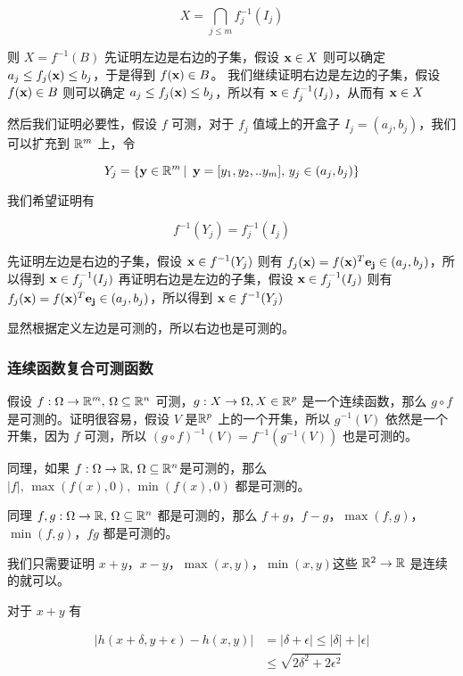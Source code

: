 \[
X = \bigcap_{j \le m}f_j^{-1}(I_j)
\]

则 $X = f^{-1}(B)$ 先证明左边是右边的子集，假设 $\mathbf{x} \in X$ 则可以确定 $a_j \le f_j(\mathbf{x}) \le b_j$，于是得到 $f(\mathbf{x}) \in B$。
我们继续证明右边是左边的子集，假设 $f(\mathbf{x}) \in B$ 则可以确定 $a_j \le f_j(\mathbf{x}) \le b_j$，所以有 $\mathbf{x} \in f_j^{-1}(I_j) $，从而有
$\mathbf{x} \in X$


然后我们证明必要性，假设 $f$ 可测，对于 $f_j$ 值域上的开盒子 $I_j = (a_j, b_j)$，我们可以扩充到 $\mathbb{R}^m$ 上，令

\[
Y_j = \{ \mathbf{y} \in \mathbb{R}^m \,\vert\,\ \mathbf{y} = [y_1, y_2, .. y_m] ,\, y_j \in (a_j, b_j)\}
\]

我们希望证明有

\[
f^{-1}(Y_j) = f_j^{-1}(I_j)
\]

先证明左边是右边的子集，假设 $\mathbf{x} \in f^{-1}(Y_j)$ 则有 $f_j(\mathbf{x}) = f(\mathbf{x})^T \mathbf{e_j} \in (a_j, b_j)$，所以得到 $\mathbf{x} \in f_j^{-1}(I_j)$
再证明右边是左边的子集，假设 $\mathbf{x} \in f_j^{-1}(I_j)$ 则有 $f_j(\mathbf{x}) = f(\mathbf{x})^T \mathbf{e_j} \in (a_j, b_j)$，所以得到 $\mathbf{x} \in f^{-1}(Y_j)$

显然根据定义左边是可测的，所以右边也是可测的。

\subsubsection{连续函数复合可测函数}

假设 $f: \Omega \to \mathbb{R}^m,\, \Omega \subseteq \mathbb{R}^n$ 可测，$g: X \to \Omega, X \in \mathbb{R}^p$ 是一个连续函数，那么 $g \circ f$ 是可测的。证明很容易，假设 $V$ 是$\mathbb{R}^p$ 上的一个开集，所以
$g^{-1}(V)$ 依然是一个开集，因为 $f$ 可测，所以 $ (g \circ f)^{-1}(V) = f^{-1}(g^{-1}(V))$ 也是可测的。

同理，如果 $f: \Omega\to \mathbb{R},\, \Omega \subseteq \mathbb{R}^n$是可测的，那么 $\lvert f \rvert,\, \max(f(x), 0), \, \min(f(x), 0)$ 都是可测的。

同理 $f, g: \Omega\to \mathbb{R},\, \Omega \subseteq \mathbb{R}^n$ 都是可测的，那么 $f +g$，$f-g$，$\max(f,g)$，$\min(f,g)$，$fg$ 都是可测的。

我们只需要证明 $x+y$，$x-y$，$\max(x,y)$，$\min(x,y)$这些 $\mathbb{R}^2 \to \mathbb{R}$ 是连续的就可以。

对于 $x+y$ 有 

\begin{align*}
\lvert h(x+\delta, y+\epsilon) - h(x,y) \rvert &= \lvert \delta + \epsilon \rvert \le \lvert \delta \rvert + \lvert \epsilon \rvert \\
& \le \sqrt{2\delta^2 + 2\epsilon^2}
\end{align*}

